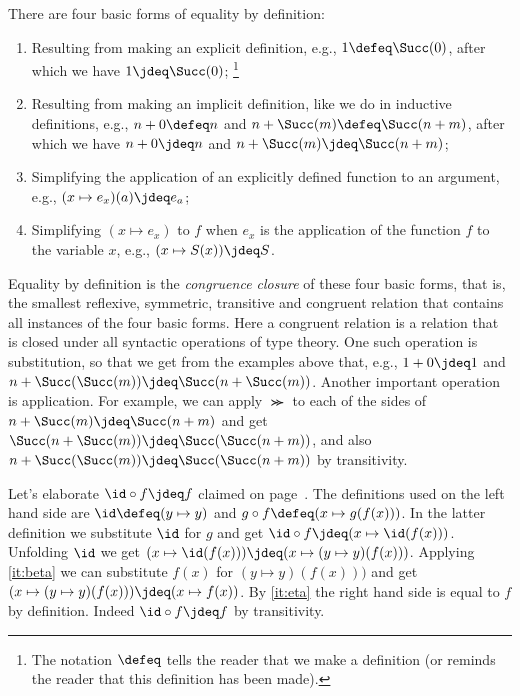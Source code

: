 There are four basic forms of equality by definition:
\begin{enumerate}
\item\label{it:exp-defeq} Resulting from making an explicit definition, 
e.g., $1 \defeq \Succ(0)$, after which we have $1 \jdeq \Succ(0)$;%
\footnote{The notation $\defeq$ tells the reader that we make a definition
(or reminds the reader that this definition has been made).}

\item\label{it:imp-defeq} Resulting from making an implicit definition, 
like we do in inductive definitions,
e.g., $n+0 \defeq n$ and $n+\Succ(m) \defeq \Succ(n+m)$,
after which we have $n+0 \jdeq n$ and $n+\Succ(m) \jdeq \Succ(n+m)$;

\item\label{it:beta} Simplifying the application of an explicitly defined 
function to an argument, e.g., $(x \mapsto e_x)(a) \jdeq e_a$;

\item\label{it:eta} Simplifying $(x \mapsto e_x)$ to $f$ when $e_x$
is the application of the function $f$ to the variable $x$,
e.g., $(x \mapsto S(x)) \jdeq S$.
\end{enumerate}

Equality by definition is the \emph{congruence closure} of these 
four basic forms, that is, the smallest reflexive, symmetric, transitive
and congruent relation that contains all instances of the four basic forms.
Here a congruent relation is a relation that is closed under all syntactic
operations of type theory. One such operation is substitution, so that we
get from the examples above that, e.g., $1+0 \jdeq 1$ 
and $n+\Succ(\Succ(m)) \jdeq \Succ(n+\Succ(m))$. Another important
operation is application. For example, we can apply $\Succ$ to each of
the sides of $n+\Succ(m) \jdeq \Succ(n+m)$ and get 
$\Succ(n+\Succ(m)) \jdeq \Succ(\Succ(n+m))$, and also
$n+\Succ(\Succ(m)) \jdeq \Succ(\Succ(n+m))$ by transitivity.

Let's elaborate $\id \circ f \jdeq f$ claimed on page~\pageref{page:idofetaf}.
The definitions used on the left hand side are 
$\id \defeq (y \mapsto y)$ and $g \circ f \defeq (x \mapsto g(f(x)))$.
In the latter definition we substitute $\id$ for $g$ and get
$\id \circ f \jdeq (x \mapsto \id(f(x)))$. Unfolding $\id$ we get
$(x \mapsto \id(f(x))) \jdeq (x \mapsto (y\mapsto y)(f(x)))$.
Applying \ref{it:beta} we can substitute $f(x)$ for $(y\mapsto y)(f(x)))$
and get $(x \mapsto (y\mapsto y)(f(x))) \jdeq (x \mapsto f(x))$.
By \ref{it:eta} the right hand side is equal to $f$ by definition.
Indeed $\id \circ f \jdeq f$ by transitivity.


